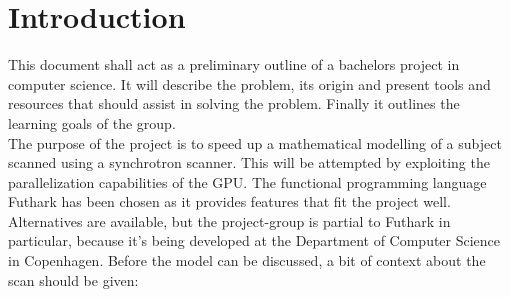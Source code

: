 \section{Introduction}
This document shall act as a preliminary outline of a bachelors project in computer science. It will describe the problem, its origin and present tools and resources that should assist in solving the problem. Finally it outlines the learning goals of the group.\\ 

The purpose of the project is to speed up a mathematical modelling of a subject scanned using a synchrotron scanner. This will be attempted by exploiting the parallelization capabilities of the GPU. The functional programming language Futhark has been chosen as it provides features that fit the project well. Alternatives are available, but the project-group is partial to Futhark in particular, because it's being developed at the Department of Computer Science in Copenhagen. Before the model can be discussed, a bit of context about the scan should be given: